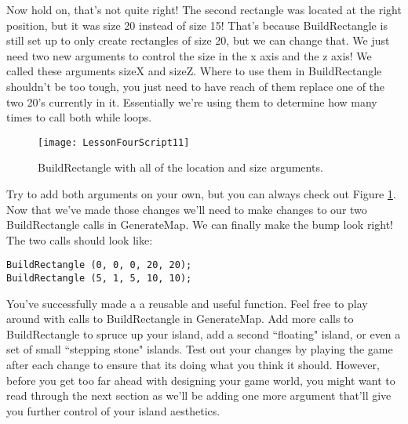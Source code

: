 \documentclass{article}
\begin{document}
\noindent{}

Now hold on, that's not quite right! The second rectangle was located at the right position, but it was size 20 instead of size 15! That's because BuildRectangle is still set up to only create rectangles of size 20, but we can change that. We just need two new arguments to control the size in the x axis and the z axis! We called these arguments sizeX and sizeZ. Where to use them in BuildRectangle shouldn't be too tough, you just need to have reach of them replace one of the two 20's currently in it. Essentially we're using them to determine how many times to call both while loops.

\begin{figure}
  \texttt{[image: LessonFourScript11]}
  \caption{BuildRectangle with all of the location and size arguments.}
  \label{fig:LessonFourScript11}
\end{figure}

Try to add both arguments on your own, but you can always check out Figure \ref{fig:LessonFourScript11}. Now that we've made those changes we'll need to make changes to our two BuildRectangle calls in GenerateMap. We can finally make the bump look right! The two calls should look like: 

\lstset{style=sharpc}
\begin{lstlisting}
BuildRectangle (0, 0, 0, 20, 20);
BuildRectangle (5, 1, 5, 10, 10);
\end{lstlisting} 

\noindent{}

You've successfully made a a reusable and useful function. Feel free to play around with calls to BuildRectangle in GenerateMap. Add more calls to BuildRectangle to spruce up your island, add a second ``floating" island, or even a set of small ``stepping stone" islands. Test out your changes by playing the game after each change to ensure that its doing what you think it should. However, before you get too far ahead with designing your game world, you might want to read through the next section as we'll be adding one more argument that'll give you further control of your island aesthetics. 
\end{document}
